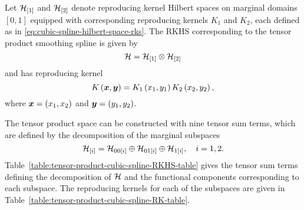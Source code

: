 \bigskip

Let $\mathcal{H}_{\left[1\right]}$ and $\mathcal{H}_{\left[2\right]}$ denote reproducing kernel Hilbert spaces on marginal domains $\left[0, 1\right]$ equipped with corresponding reproducing kernels $K_1$ and $K_2$, each defined as in \eqref{eq:cubic-spline-hilbert-space-rks}. The RKHS corresponding to the tensor product smoothing spline is given by
\[
\mathcal{H} = \mathcal{H}_{\left[1\right]} \otimes \mathcal{H}_{\left[2\right]}
\]
\noindent
and has reproducing kernel 
\[
K\left(\mbox{\boldmath $x$},\mbox{\boldmath $y$}\right) = K_1\left(x_1,y_1\right) K_2\left(x_{2},y_{2}\right),
\]
\noindent 
where $\mbox{\boldmath $x$} = \left(x_1, x_2\right)$ and $\mbox{\boldmath $y$} = \left(y_1, y_2\right)$.

\bigskip

The tensor product space can be constructed with nine tensor sum terms, which are defined by the decomposition of the marginal subspaces
\[
\mathcal{H}_{\left[i\right]} = \mathcal{H}_{00\left[i\right]}  \oplus  \mathcal{H}_{01\left[i\right]} \oplus \mathcal{H}_{1\left[i\right]}, \quad i = 1,2.
\]
\noindent
Table~\ref{table:tensor-product-cubic-spline-RKHS-table} gives the tensor sum terms defining the decomposition of $\mathcal{H}$ and the functional components corresponding to each subspace. The reproducing kernels for each of the subspaces are given in Table~\ref{table:tensor-product-cubic-spline-RK-table}.


